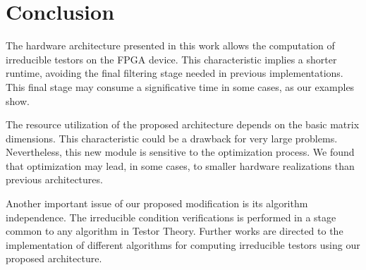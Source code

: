 \documentclass[conference]{IEEEtran}
\begin{document}
\section{Conclusion}
\label{sect:8}
The hardware architecture presented in this work allows the computation of irreducible testors on the FPGA 
device. This characteristic implies a shorter runtime, avoiding the final filtering stage needed in previous 
implementations. This final stage may consume a significative time in some cases, as our examples show.

The resource utilization of the proposed architecture depends on the basic matrix dimensions. This characteristic 
could be a drawback for very large problems. Nevertheless, this new module is sensitive to the optimization 
process. We found that optimization may lead, in some cases, to smaller hardware realizations than previous 
architectures. 

Another important issue of our proposed modification is its algorithm independence. The irreducible condition verifications is performed in a stage common to any algorithm in Testor Theory. Further works are directed to 
the implementation of different algorithms for computing irreducible testors using our proposed architecture.
\end{document}
